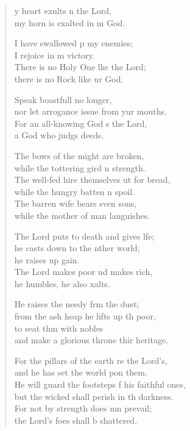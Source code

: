 \settowidth{\versewidth}{He will guard the footsteps of his faithful ones, *}
\begin{verse}%
  \begin{patverse}
    y heart exults \pointup{\i}n the Lord,\Med\\
my horn is exalted in m God.

I have swallowed p my enemies;\Med\\
I rejoice in m victory.\\
There is no Holy One l\pointup{\i}ke the Lord;\Med\\
there is no Rock like ur God.

Speak boastfull no longer,\Med\\
nor let arrogance issue from yur mouths.\\
For an all-knowing God \pointup{\i}s the Lord,\Med\\
a God who judgs deeds.

The bows of the might are broken,\Med\\
while the tottering gird n strength.\\
The well-fed hire themselves ut for bread,\Med\\
while the hungry batten n spoil.\\
The barren wife bears sven sons,\Med\\
while the mother of man languishes.

The Lord puts to death and gives l\pointup{\i}fe;\Flex\\
he casts down to the nther world;\Med\\
he raises up gain.\\
The Lord makes poor nd makes rich,\Med\\
he humbles, he also xalts.

He raises the needy frm the dust;\Med\\
from the ash heap he lifts up th poor,\\
to seat thm with nobles\Med\\
and make a glorious throne thir heritage.

For the pillars of the earth re the Lord’s,\Med\\
and he has set the world pon them.\\
He will guard the footsteps f his faithful ones,\Med\\
but the wicked shall perish in th darkness.\\
For not by strength does mn prevail;\Med\\
the Lord’s foes shall b shattered.


\end{patverse}
\end{verse}
